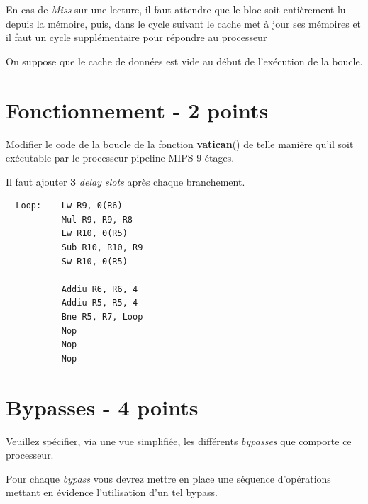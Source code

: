 En cas de \textit{Miss} sur une lecture, il faut attendre que le bloc soit
enti\`erement lu depuis la m\'emoire, puis, dans le cycle suivant le cache
met \`a jour ses m\'emoires et il faut un cycle suppl\'ementaire pour
r\'epondre au processeur

On suppose que le cache de donn\'ees est vide au d\'ebut de l'ex\'ecution
de la boucle.

%
%

\section{Fonctionnement - 2 points}

Modifier le code de la boucle de la fonction \textbf{vatican}() de telle
mani\`ere qu'il soit ex\'ecutable par le processeur pipeline MIPS 9 \'etages.

\begin{correction}

  Il faut ajouter \textbf{3} \textit{delay slots} apr\`es chaque
  branchement.

  \begin{verbatim}
  Loop:    Lw R9, 0(R6)
           Mul R9, R9, R8
           Lw R10, 0(R5)
           Sub R10, R10, R9
           Sw R10, 0(R5)

           Addiu R6, R6, 4
           Addiu R5, R5, 4
           Bne R5, R7, Loop
           Nop
           Nop
           Nop
  \end{verbatim}

\end{correction}

%
%

\section{Bypasses - 4 points}

Veuillez sp\'ecifier, via une vue simplifi\'ee, les diff\'erents
\textit{bypasses} que comporte ce processeur.

Pour chaque \textit{bypass} vous devrez mettre en place une s\'equence
d'op\'erations mettant en \'evidence l'utilisation d'un tel bypass.

